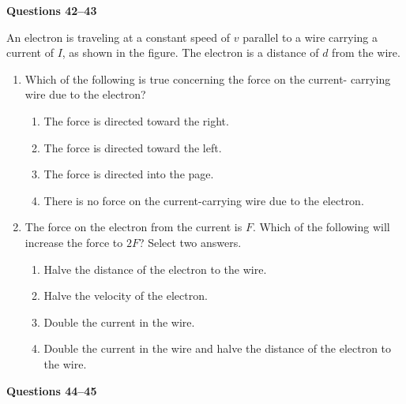 \documentclass{../../oss-apphys}
\begin{document}
\begin{multicols}{2}
  \columnbreak

  \textbf{Questions 42--43}

  An electron is traveling at a constant speed of $v$ parallel to a wire
  carrying a current of $I$, as shown in the figure. The electron is a distance
  of $d$ from the wire.
  \begin{center}
  \end{center}
  
  \begin{enumerate}[leftmargin=18pt,resume]
  \item Which of the following is true concerning the force on the current-
    carrying wire due to the electron?
    \begin{enumerate}[noitemsep,topsep=0pt,leftmargin=18pt,label=(\Alph*)]
    \item The force is directed toward the right.
    \item The force is directed toward the left.
    \item The force is directed into the page.
    \item There is no force on the current-carrying wire due to the electron.
    \end{enumerate}

  \item The force on the electron from the current is $F$. Which of the
    following will increase the force to $2F$? Select two answers.
    \begin{enumerate}[noitemsep,topsep=0pt,leftmargin=18pt,label=(\Alph*)]
    \item Halve the distance of the electron to the wire.
    \item Halve the velocity of the electron.
    \item Double the current in the wire.
    \item Double the current in the wire and halve the distance of the electron
      to the wire.
    \end{enumerate}
  \end{enumerate}

  \columnbreak

  \textbf{Questions 44--45}


\end{multicols}
\end{document}
